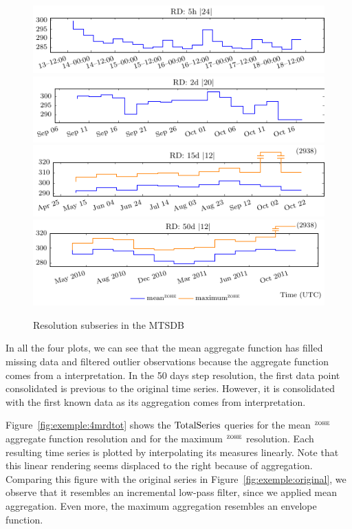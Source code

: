 \begin{figure}[tp]
  \centering
  \includegraphics{fig_exemple_4mrd1.pdf}
  \includegraphics{fig_exemple_4mrd2.pdf}
  \includegraphics{fig_exemple_4mrd3.pdf}
  \includegraphics{fig_exemple_4mrd4.pdf}
  \caption{Resolution subseries in the MTSDB}
  \label{fig:exemple:4mrd}
\end{figure}

In all the four plots, we can see that the mean aggregate function has
filled missing data and filtered outlier observations because the
aggregate function comes from a \zohe{} interpretation.  In the 50
days step resolution, the first data point consolidated is previous to
the original time series. However, it is consolidated with the first
known data as its aggregation comes from \zohe{} interpretation.

Figure~\ref{fig:exemple:4mrdtot} shows the $\operatorname{TotalSeries}$ queries for
the mean $^{\zohe}$ aggregate function resolution and for the maximum
$^{\zohe}$ resolution.  Each resulting time series is plotted by
interpolating its measures linearly. Note that this linear rendering
seems displaced to the right because of \zohe{} aggregation.
Comparing this figure with the original series in
Figure~\ref{fig:exemple:original}, we observe that it resembles an
incremental low-pass filter, since we applied mean aggregation. Even
more, the maximum aggregation resembles an envelope function.

